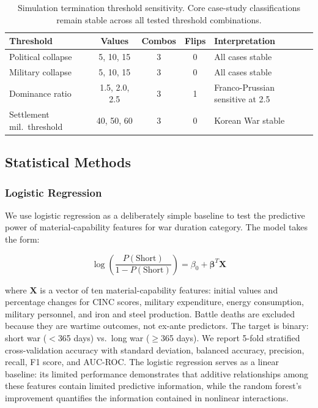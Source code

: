 \begin{table}[H]
\centering
\caption{Simulation termination threshold sensitivity. Core case-study classifications remain stable across all tested threshold combinations.}
\label{tab:threshold_sensitivity_extra}
\small
\begin{tabularx}{\textwidth}{@{}l c c c X@{}}
\toprule
\textbf{Threshold} & \textbf{Values} & \textbf{Combos} & \textbf{Flips} & \textbf{Interpretation} \\
\midrule
Political collapse & 5, 10, 15 & 3 & 0 & All cases stable \\
Military collapse & 5, 10, 15 & 3 & 0 & All cases stable \\
Dominance ratio & 1.5, 2.0, 2.5 & 3 & 1 & Franco-Prussian sensitive at 2.5 \\
Settlement mil.\ threshold & 40, 50, 60 & 3 & 0 & Korean War stable \\
\bottomrule
\end{tabularx}
\end{table}

\subsection{Statistical Methods}

\subsubsection{Logistic Regression}

We use logistic regression as a deliberately simple baseline to test the predictive power of material-capability features for war duration category. The model takes the form:

\begin{equation}
\log\left(\frac{P(\text{Short})}{1 - P(\text{Short})}\right) = \beta_0 + \boldsymbol{\beta}^T \mathbf{X}
\end{equation}

\noindent where $\mathbf{X}$ is a vector of ten material-capability features: initial values and percentage changes for CINC scores, military expenditure, energy consumption, military personnel, and iron and steel production. Battle deaths are excluded because they are wartime outcomes, not ex-ante predictors. The target is binary: short war ($<$365 days) vs.\ long war ($\geq$365 days). We report 5-fold stratified cross-validation accuracy with standard deviation, balanced accuracy, precision, recall, F1 score, and AUC-ROC. The logistic regression serves as a linear baseline: its limited performance demonstrates that additive relationships among these features contain limited predictive information, while the random forest's improvement quantifies the information contained in nonlinear interactions.

